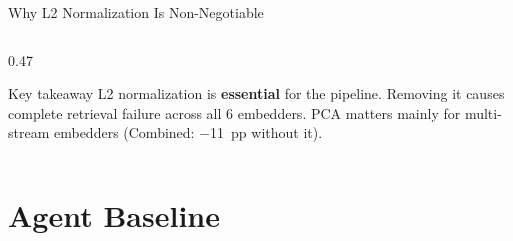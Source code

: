 \documentclass[aspectratio=169,10pt]{beamer}
\begin{document}
\begin{frame}{Why L2 Normalization Is Non-Negotiable}
\begin{columns}[T]
\begin{column}{0.47\textwidth}
  \vspace{0.5em}
  \begin{alertblock}{\scriptsize Key takeaway}
    \scriptsize L2 normalization is \textbf{essential} for the pipeline.
    Removing it causes complete retrieval failure across all 6 embedders.
    PCA matters mainly for multi-stream embedders (Combined: $-$11~pp without it).
  \end{alertblock}

\end{column}
\end{columns}
\end{frame}

\section{Agent Baseline}
\end{document}
